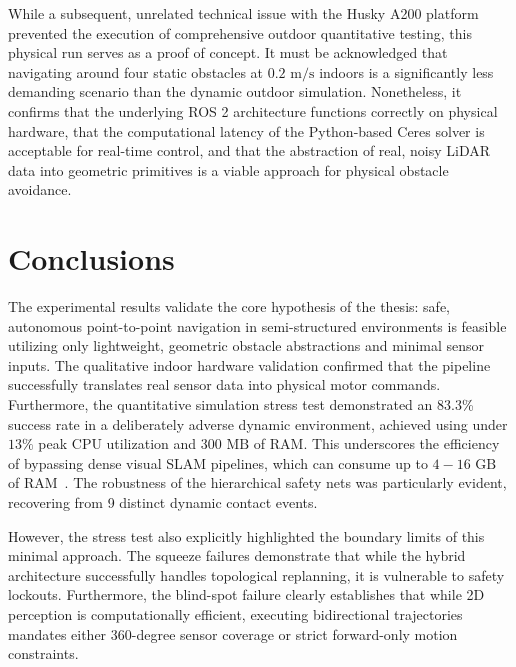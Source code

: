 While a subsequent, unrelated technical issue with the Husky A200 platform prevented the execution of comprehensive outdoor quantitative testing, this physical run serves as a proof of concept. It must be acknowledged that navigating around four static obstacles at $0.2\text{ m/s}$ indoors is a significantly less demanding scenario than the dynamic outdoor simulation. Nonetheless, it confirms that the underlying ROS 2 architecture functions correctly on physical hardware, that the computational latency of the Python-based Ceres solver is acceptable for real-time control, and that the abstraction of real, noisy LiDAR data into geometric primitives is a viable approach for physical obstacle avoidance.

\section{Conclusions}
\label{sec:exp-conclusions}

The experimental results validate the core hypothesis of the thesis: safe, autonomous point-to-point navigation in semi-structured environments is feasible utilizing only lightweight, geometric obstacle abstractions and minimal sensor inputs. The qualitative indoor hardware validation confirmed that the pipeline successfully translates real sensor data into physical motor commands. Furthermore, the quantitative simulation stress test demonstrated an 83.3\% success rate in a deliberately adverse dynamic environment, achieved using under $13\%$ peak CPU utilization and $300\text{ MB}$ of RAM. This underscores the efficiency of bypassing dense visual SLAM pipelines, which can consume up to $4-16\text{ GB}$ of RAM~\cite{schmidt2025vislam}. The robustness of the hierarchical safety nets was particularly evident, recovering from 9 distinct dynamic contact events.

However, the stress test also explicitly highlighted the boundary limits of this minimal approach. The squeeze failures demonstrate that while the hybrid architecture successfully handles topological replanning, it is vulnerable to safety lockouts. Furthermore, the blind-spot failure clearly establishes that while 2D perception is computationally efficient, executing bidirectional trajectories mandates either 360-degree sensor coverage or strict forward-only motion constraints.

